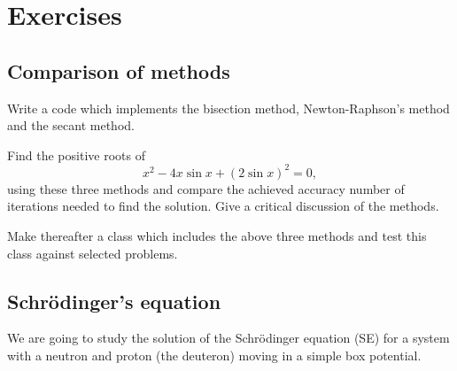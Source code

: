 



\section{Exercises}

\subsection*{Comparison of methods}

Write a code which implements the bisection method, Newton-Raphson's method  and
the secant method.  

Find the positive roots of
\[
x^2 -4x \sin {x}+(2\sin{x})^2=0,
\]
using these three methods and compare the achieved accuracy number of iterations needed
to find the solution.  Give a critical discussion of the methods.

Make thereafter a class which includes the above three methods and test this class against
selected problems.

\subsection*{Schr\"odinger's equation}
We are going to study the solution of 
the Schr\"odinger equation (SE)
for a system with a neutron and proton (the deuteron)
moving in  a simple box potential. 

